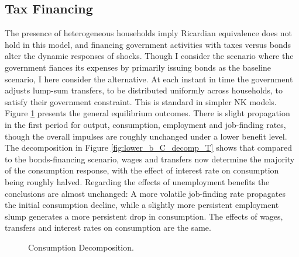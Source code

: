 \subsection{Tax Financing}
The presence of heterogeneous households imply Ricardian equivalence does not hold in this model, and financing government activities with taxes versus bonds alter the dynamic responses of shocks. Though I consider the scenario where the government fiances its expenses by primarily issuing bonds as the baseline scenario, I here consider the alternative. At each instant in time the government adjusts lump-sum transfers, to be distributed uniformly across households, to satisfy their government constraint. This is standard in simpler NK models. 
Figure \ref{fig:lower_b_shocks_T} presents the general equilibrium outcomes. There is slight propagation in the first period for output, consumption, employment and job-finding rates, though the overall impulses are roughly unchanged under a lower benefit level. 
The decomposition in Figure \ref{fig:lower_b_C_decomp_T} shows that compared to the bonds-financing scenario, wages and transfers now determine the majority of the consumption response, with the effect of interest rate on consumption being roughly halved. Regarding the effects of unemployment benefits the conclusions are almost unchanged: A more volatile job-finding rate propagates the initial consumption decline, while a slightly more persistent employment slump generates a more persistent drop in consumption. The effects of wages, transfers and interest rates on consumption are the same.  


\begin{figure}[H]
\caption[Caption for LOF]{Consumption Decomposition.}
\label{fig:lower_b_shocks_T}
\end{figure}


